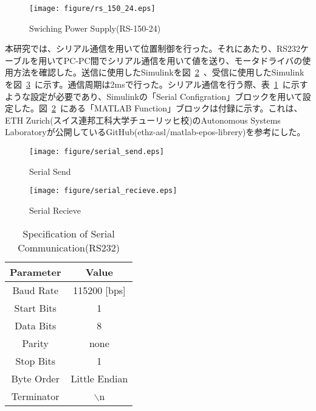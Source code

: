 \documentclass[a4paper,12pt]{article_vdlab_sotsuron}
\begin{document}
\vspace*{10mm}
\begin{figure}[htp]
  \begin{center}
    \texttt{[image: figure/rs\_150\_24.eps]}
    \vspace*{3mm}
    \caption{Swiching Power Supply(RS-150-24)}
    \label{fig:rs_150_24}
  \end{center}
\end{figure}

\newpage
本研究では、シリアル通信を用いて位置制御を行った。それにあたり、RS232ケーブルを用いてPC-PC間でシリアル通信を用いて値を送り、モータドライバの使用方法を確認した。送信に使用したSimulinkを図~\ref{fig:serial_send}~、受信に使用したSimulinkを図~\ref{fig:serial_recieve}~に示す。通信周期は2msで行った。シリアル通信を行う際、表~\ref{tab:serial}~に示すような設定が必要であり、Simulinkの「Serial Configration」ブロックを用いて設定した。図~\ref{fig:serial_send}~にある「MATLAB Function」ブロックは付録に示す。これは、ETH Zurich(スイス連邦工科大学チューリッヒ校)のAutonomous Systems Laboratoryが公開しているGitHub(ethz-asl/matlab-epos-librery)を参考にした。\cite{99}

\vspace*{10mm}
\begin{figure}[htp]
  \begin{center}
    \texttt{[image: figure/serial\_send.eps]}
    \vspace*{3mm}
    \caption{Serial Send}
    \label{fig:serial_send}
  \end{center}
\end{figure}

\vspace*{10mm}
\begin{figure}[htp]
  \begin{center}
    \texttt{[image: figure/serial\_recieve.eps]}
      \vspace*{3mm}
      \caption{Serial Recieve}
      \label{fig:serial_recieve}
  \end{center}
\end{figure}

\newpage
\begin{table}[htp]
  \begin{center}
    \makeatletter
    \def\@captype{table}
    \makeatother
    \caption{Specification of Serial Communication(RS232)}
      \label{tab:serial}
	\begin{tabular}{cc}\hline
	  Parameter & Value\\\hline
	  Baud Rate & 115200 [bps]\\
	  Start Bits & 1\\
	  Data Bits & 8\\
	  Parity & none\\
	  Stop Bits & 1\\
	  Byte Order & Little Endian\\
	  Terminator & $\backslash$n\\\hline
      \end{tabular}
    \end{center}
\end{table}
\end{document}
